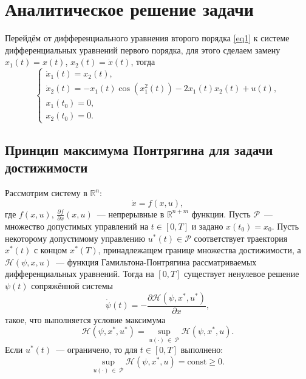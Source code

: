 \documentclass[a4paper,12pt]{article}
\begin{document}
\section{Аналитическое решение задачи}
Перейдём от дифференциального уравнения второго порядка \eqref{eq1} к системе дифференциальных уравнений первого порядка, для этого сделаем замену $x_1(t) = x(t)$, $x_2(t) = \dot{x}(t)$, тогда
\begin{equation} \label{eq2}
	\begin{cases}
		\dot{x}_1(t) = x_2(t), \\
		\dot{x}_2(t) = -x_1(t)\cos\left(x_1^2(t)\right) - 2x_1(t)x_2(t) + u(t), \\
		x_1(t_0) = 0, \\
		x_2(t_0) = 0.
	\end{cases}
\end{equation}

\subsection{Принцип максимума Понтрягина для задачи достижимости}
Рассмотрим систему в $\mathbb{R}^n$:
\[ \dot{x} = f(x, u),\]
где $f(x, u)$, $\frac{\partial f}{\partial x}(x, u)$~--- непрерывные в $\mathbb{R}^{n+m}$ функции. Пусть $\mathcal{P}$~--- множество допустимых управлений на $t \in [0, T]$ и задано $x(t_0) = x_0$. Пусть некоторому допустимому управлению $u^*(t) \in \mathcal{P}$ соответствует траектория $x^*(t)$ с концом $x^*(T)$, принадлежащем границе множества достижимости, а $\mathcal{H}(\psi, x, u)$~--- функция Гамильтона-Понтрягина рассматриваемых дифференциальных уравнений. Тогда на $[0, T]$ существует ненулевое решение $\psi(t)$ сопряжённой системы
\begin{equation}\label{eq5}
\dot{\psi}(t) = - \dfrac{\partial{\mathcal{H}(\psi, x^*, u^*)}}{\partial{x}},
\end{equation}
такое, что выполняется условие максимума  
\begin{equation}\label{eq4} 
\mathcal{H}(\psi, x^*, u^*) = \sup_{u(\cdot) \ \in \ \mathcal{P}}{\mathcal{H}(\psi, x^*, u)}.
\end{equation} 
Если $u^*(t)$~--- ограничено, то для $t \in [0, T]$ выполнено:
\begin{equation}\label{eq7}
	\sup\limits_{u(\cdot) \ \in \ \mathcal{P}}{\mathcal{H}(\psi, x^*, u)} = \mathrm{const} \geqslant 0.
\end{equation} 
\end{document}

